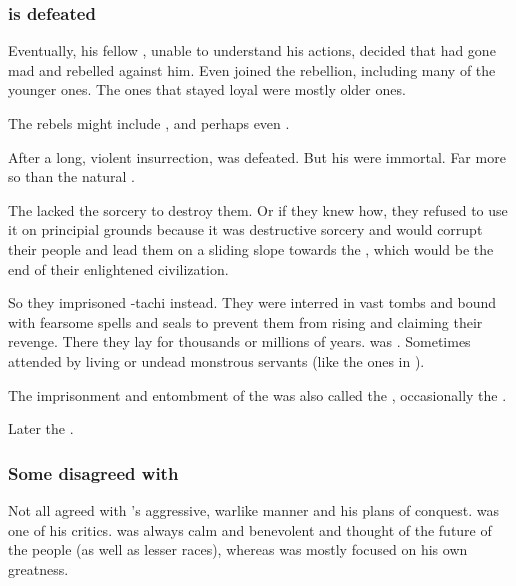 \subsubsection{\Sethicus is defeated}
Eventually, his fellow \ophidians, unable to understand his actions, decided that \Sethicus had gone mad and rebelled against him. 
Even \dragons joined the rebellion, including many of the younger ones. 
The ones that stayed loyal were mostly older ones. 

The rebels might include \Iurzmacul, \Nexagglachel and perhaps even \Ishnaruchaefir. 

After a long, violent insurrection, \Sethicus was defeated.
But his \dragons were immortal.
Far more so than the natural \ophidians.

The \ophidians lacked the sorcery to destroy them. 
Or if they knew how, they refused to use it on principial grounds because it was destructive sorcery and would corrupt their people and lead them on a sliding slope towards the \xs, which would be the end of their enlightened civilization.

So they imprisoned \Sethicus-tachi instead.
They were interred in vast tombs and bound with fearsome spells and seals to prevent them from rising and claiming their revenge.
There they lay for thousands or millions of years.
\Nexagglachel was . 
Sometimes attended by living or undead monstrous servants (like the ones in \Nithdornazsh).

The imprisonment and entombment of the \dragons was also called the , occasionally the .

Later the \dragons {}. 





\subsubsection{Some \dragons disagreed with \Sethicus}
Not all \dragons agreed with \Sethicus's aggressive, warlike manner and his plans of conquest. 
\Nexagglachel was one of his critics.
\Nexagglachel was always calm and benevolent and thought of the future of the people (\ophidians as well as lesser races), whereas \Sethicus was mostly focused on his own greatness. 


